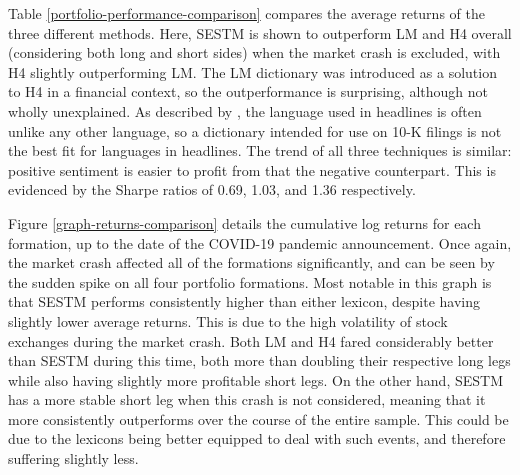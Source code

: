 Table \ref{portfolio-performance-comparison} compares the average returns of the three different methods. Here, SESTM is shown to outperform LM and H4 overall (considering both long and short sides) when the market crash is excluded, with H4 slightly outperforming LM. The LM dictionary was introduced as a solution to H4 in a financial context, so the outperformance is surprising, although not wholly unexplained. As described by \textcite{language-newspapers}, the language used in headlines is often unlike any other language, so a dictionary intended for use on 10-K filings is not the best fit for languages in headlines. The trend of all three techniques is similar: positive sentiment is easier to profit from that the negative counterpart. This is evidenced by the Sharpe ratios of 0.69, 1.03, and 1.36 respectively.

Figure \ref{graph-returns-comparison} details the cumulative log returns for each formation, up to the date of the COVID-19 pandemic announcement. Once again, the market crash affected all of the formations significantly, and can be seen by the sudden spike on all four portfolio formations. Most notable in this graph is that SESTM performs consistently higher than either lexicon, despite having slightly lower average returns. This is due to the high volatility of stock exchanges during the market crash. Both LM and H4 fared considerably better than SESTM during this time, both more than doubling their respective long legs while also having slightly more profitable short legs. On the other hand, SESTM has a more stable short leg when this crash is not considered, meaning that it more consistently outperforms over the course of the entire sample. This could be due to the lexicons being better equipped to deal with such events, and therefore suffering slightly less.

